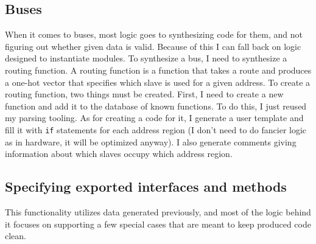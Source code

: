 \documentclass[12pt]{report}
\begin{document}
\subsection{Buses}
When it comes to buses, most logic goes to synthesizing code for them, and not figuring out whether given data is valid. Because of this I can fall back on logic designed to instantiate modules. To synthesize a bus, I need to synthesize a routing function.
A routing function is a function that takes a route and produces a one-hot vector that specifies which slave is used for a given address. 
To create a routing function, two things must be created. First, I need to create a new function and add it to the database of known functions. To do this, I just reused my parsing tooling. As for creating a code for it, I generate a user template and fill it with \verb!if! statements for each address region (I don't need to do fancier logic as in hardware, it will be optimized anyway). I also generate comments giving information about which slaves occupy which address region.

\subsection{Specifying exported interfaces and methods}
This functionality utilizes data generated previously, and most of the logic behind it focuses on supporting a few special cases that are meant to keep produced code clean.
\end{document}
